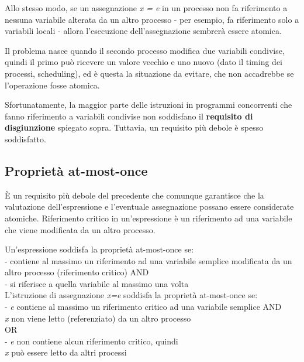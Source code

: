 \documentclass[10pt,a4paper]{book}
\begin{document}
Allo stesso modo, se un assegnazione \textit{x = e} in un processo non fa riferimento a nessuna variabile alterata da un altro processo - per esempio, fa riferimento solo a variabili locali - allora l'esecuzione dell'assegnazione sembrerà essere atomica.

Il problema nasce quando il secondo processo modifica due variabili condivise, quindi il primo può ricevere  un valore vecchio e uno nuovo (dato il timing dei processi, scheduling), ed è questa la situazione da evitare, che non accadrebbe se l'operazione fosse atomica.

Sfortunatamente, la maggior parte delle istruzioni in programmi concorrenti che fanno riferimento a
variabili condivise non soddisfano il \textbf{requisito di disgiunzione} spiegato sopra. 
Tuttavia, un requisito più debole è spesso soddisfatto.

\subsection{Proprietà at-most-once}
\`{E} un requisito più debole del precedente che comunque garantisce che la valutazione dell'espressione e l'eventuale assegnazione possano essere considerate atomiche.
Riferimento critico in un'espressione è un riferimento ad una variabile che viene modificata da un altro processo.

Un'espressione soddisfa la proprietà at-most-once se:\\
- contiene al massimo un riferimento ad una variabile semplice modificata da un altro processo (riferimento critico) AND\\
- si riferisce a quella variabile al massimo una volta\\

L'istruzione di assegnazione \textit{x=e} soddisfa la proprietà at-most-once se:\\
- \textit{e} contiene al massimo un riferimento critico ad una variabile semplice AND\\
\textit{x} non viene letto (referenziato) da un altro processo\\
OR\\
- \textit{e} non contiene alcun riferimento critico, quindi \\
\textit{x} può essere letto da altri processi\\
\end{document}
